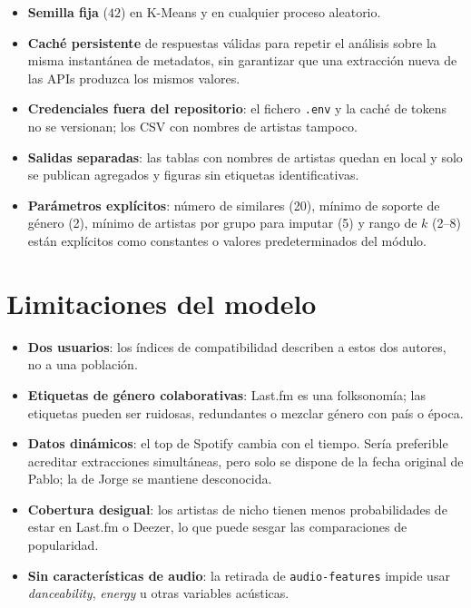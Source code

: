 \begin{itemize}
    \item \textbf{Semilla fija} ($42$) en K-Means y en cualquier proceso aleatorio.
    \item \textbf{Caché persistente} de respuestas válidas para repetir el análisis sobre la misma instantánea de metadatos, sin garantizar que una extracción nueva de las APIs produzca los mismos valores.
    \item \textbf{Credenciales fuera del repositorio}: el fichero \texttt{.env} y la caché de tokens no se versionan; los CSV con nombres de artistas tampoco.
    \item \textbf{Salidas separadas}: las tablas con nombres de artistas quedan en local y solo se publican agregados y figuras sin etiquetas identificativas.
    \item \textbf{Parámetros explícitos}: número de similares (20), mínimo de soporte de género (2), mínimo de artistas por grupo para imputar (5) y rango de $k$ (2--8) están explícitos como constantes o valores predeterminados del módulo.
\end{itemize}

\section{Limitaciones del modelo}
\label{sec:limitaciones-modelo}

\begin{itemize}
    \item \textbf{Dos usuarios}: los índices de compatibilidad describen a estos dos autores, no a una población.
    \item \textbf{Etiquetas de género colaborativas}: Last.fm es una folksonomía; las etiquetas pueden ser ruidosas, redundantes o mezclar género con país o época.
    \item \textbf{Datos dinámicos}: el top de Spotify cambia con el tiempo. Sería preferible acreditar extracciones simultáneas, pero solo se dispone de la fecha original de Pablo; la de Jorge se mantiene desconocida.
    \item \textbf{Cobertura desigual}: los artistas de nicho tienen menos probabilidades de estar en Last.fm o Deezer, lo que puede sesgar las comparaciones de popularidad.
    \item \textbf{Sin características de audio}: la retirada de \texttt{audio-features} impide usar \emph{danceability}, \emph{energy} u otras variables acústicas.
\end{itemize}
